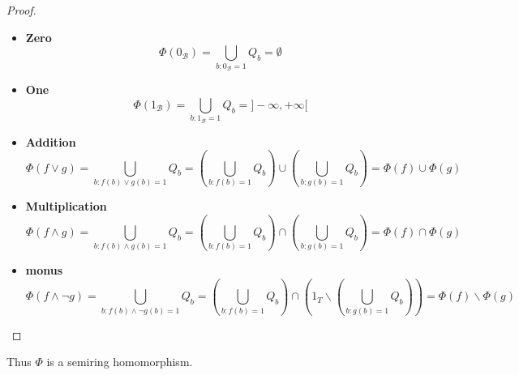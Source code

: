 \begin{proof}
\begin{itemize}
\item \textbf{Zero}
$$
\Phi(0_{\mathcal{B}}) = \bigcup_{b:0_\mathcal{B}=1} Q_b = \emptyset
$$

\item
\textbf{One}
$$
\Phi(1_{\mathcal{B}}) = \bigcup_{b:1_\mathcal{B}=1} Q_b = ]-\infty, +\infty[
$$
\item
\textbf{Addition}
$$
\Phi(f \lor g)
= \bigcup_{b: f(b) \lor g(b) = 1} Q_b
= \left(\bigcup_{b: f(b) = 1} Q_b\right) \cup \left(\bigcup_{b: g(b) = 1} Q_b\right)
= \Phi(f) \cup \Phi(g)
$$
\item
\textbf{Multiplication}
$$
\Phi(f \land g)
= \bigcup_{b: f(b) \land g(b) = 1} Q_b
= \left(\bigcup_{b: f(b) = 1} Q_b\right) \cap \left(\bigcup_{b: g(b) = 1} Q_b\right)
= \Phi(f) \cap \Phi(g)
$$
\item
\textbf{monus}
$$
\Phi(f \land \neg g)
= \bigcup_{b: f(b) \land \neg g(b) = 1} Q_b
= \left(\bigcup_{b: f(b) = 1} Q_b\right) \cap \left(1_T \backslash \left(\bigcup_{b: g(b) = 1} Q_b\right)\right)
= \Phi(f) \backslash \Phi(g)
$$
    

\end{itemize}

\end{proof}

Thus $\Phi$ is a semiring homomorphism.



